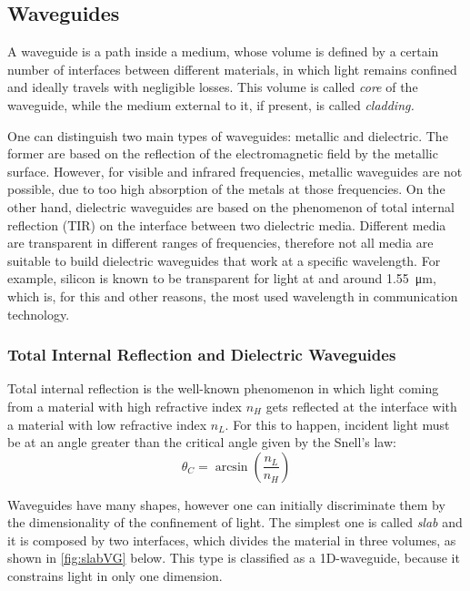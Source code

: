 \subsection{Waveguides}
\label{ssec:waveguides}
A waveguide is a path inside a medium, whose volume is defined by a certain number of interfaces between different materials, in which light remains confined and ideally travels with negligible losses.
This volume is called \textit{core} of the waveguide, while the medium external to it, if present, is called \textit{cladding.}

One can distinguish two main types of waveguides: metallic and dielectric.
The former are based on the reflection of the electromagnetic field by the metallic surface.
However, for visible and infrared frequencies, metallic waveguides are not possible, due to too high absorption of the metals at those frequencies.
On the other hand, dielectric waveguides are based on the phenomenon of total internal reflection (TIR) on the interface between two dielectric media.
Different media are transparent in different ranges of frequencies, therefore not all media are suitable to build dielectric waveguides that work at a specific wavelength.
For example, silicon is known to be transparent for light at and around \SI{1.55}{\um}, which is, for this and other reasons, the most used wavelength in communication technology.

\subsubsection{Total Internal Reflection and Dielectric Waveguides}
Total internal reflection is the well-known phenomenon in which light coming from a material with high refractive index $n_H$ gets reflected at the interface with a material with low refractive index $n_L$.
For this to happen, incident light must be at an angle greater than the critical angle given by the Snell's law:
\begin{equation*}
	\theta_C = \arcsin \left( \dfrac{n_L}{n_H}\right)
\end{equation*}

Waveguides have many shapes, however one can initially discriminate them by the dimensionality of the confinement of light.
The simplest one is called \textit{slab} and it is composed by two interfaces, which divides the material in three volumes, as shown in \autoref{fig:slabVG} below.
This type is classified as a 1D-waveguide, because it constrains light in only one dimension.

